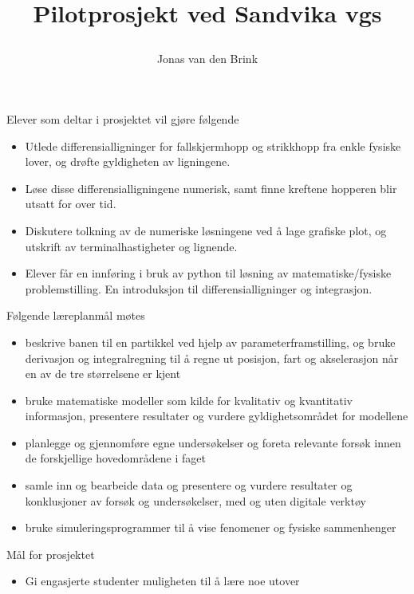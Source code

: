 \documentclass[a4paper, 11pt, notitlepage, english]{article}
\title{{\centerline{\Huge Pilotprosjekt ved Sandvika vgs}}}
\author{Jonas van den Brink}
\begin{document}
\maketitle

Elever som deltar i prosjektet vil gjøre følgende
\begin{itemize}
 \item Utlede differensialligninger for fallskjermhopp og strikkhopp fra enkle fysiske lover, og drøfte gyldigheten av ligningene.
 \item Løse disse differensialligningene numerisk, samt finne kreftene hopperen blir utsatt for over tid.
 \item Diskutere tolkning av de numeriske løsningene ved å lage grafiske plot, og utskrift av terminalhastigheter og lignende.
 \item Elever får en innføring i bruk av python til løsning av matematiske/fysiske problemstilling. En introduksjon til differensialligninger og integrasjon.
\end{itemize}


Følgende læreplanmål møtes
\begin{itemize}
 \item beskrive banen til en partikkel ved hjelp av parameterframstilling, og bruke derivasjon og integralregning til å regne ut posisjon, fart og akselerasjon når en av de tre størrelsene er kjent
 \item bruke matematiske modeller som kilde for kvalitativ og kvantitativ informasjon, presentere resultater og vurdere gyldighetsområdet for modellene
\item planlegge og gjennomføre egne undersøkelser og foreta relevante forsøk innen de forskjellige hovedområdene i faget
\item samle inn og bearbeide data og presentere og vurdere resultater og konklusjoner av forsøk og undersøkelser, med og uten digitale verktøy
\item bruke simuleringsprogrammer til å vise fenomener og fysiske sammenhenger
\end{itemize}

Mål for prosjektet
\begin{itemize}
 \item Gi engasjerte studenter muligheten til å lære noe utover
\end{itemize}
\end{document}
